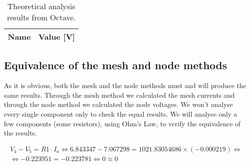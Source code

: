 \begin{table}[h]
  \centering
  \begin{tabular}{|l|r|}
    \hline    
    {\bf Name} & {\bf Value [V]} \\ \hline
     
  \end{tabular}
  \caption{Theoretical analysis results from Octave.}
  \label{tab:node}
\end{table}

\subsection{Equivalence of the mesh and node methods}

As it is obvious, both the mesh and the node methods must and will produce the same results. Through the mesh method we calculated the mesh currents and through the node method we calculated the node voltages. We won't analyse every single component only to check the equal results. We will analyse only a few components (some resistors), using Ohm's Law, to verify the equivalence of the results.

\begin{gather*}
  V_4 - V_5=R1 \cdot I_a \Leftrightarrow 6.843347 - 7.067298=1021.83054686\times(-0.000219) \Leftrightarrow \\
  \Leftrightarrow -0.223951 = -0.223781 \Leftrightarrow 0 \approx 0 
\end{gather*}

